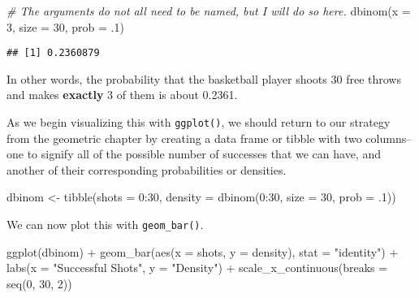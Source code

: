 \documentclass[
]{book}
\newenvironment{Shaded}{\begin{snugshade}}{\end{snugshade}}
\newcommand{\AttributeTok}[1]{\textcolor[rgb]{0.77,0.63,0.00}{#1}}
\newcommand{\CommentTok}[1]{\textcolor[rgb]{0.56,0.35,0.01}{\textit{#1}}}
\newcommand{\DecValTok}[1]{\textcolor[rgb]{0.00,0.00,0.81}{#1}}
\newcommand{\FunctionTok}[1]{\textcolor[rgb]{0.00,0.00,0.00}{#1}}
\newcommand{\NormalTok}[1]{#1}
\newcommand{\OtherTok}[1]{\textcolor[rgb]{0.56,0.35,0.01}{#1}}
\newcommand{\SpecialCharTok}[1]{\textcolor[rgb]{0.00,0.00,0.00}{#1}}
\newcommand{\StringTok}[1]{\textcolor[rgb]{0.31,0.60,0.02}{#1}}
\begin{document}
\begin{Shaded}
\begin{Highlighting}[]
\CommentTok{\# The arguments do not all need to be named, but I will do so here.}
\FunctionTok{dbinom}\NormalTok{(}\AttributeTok{x =} \DecValTok{3}\NormalTok{, }\AttributeTok{size =} \DecValTok{30}\NormalTok{, }\AttributeTok{prob =}\NormalTok{ .}\DecValTok{1}\NormalTok{)}
\end{Highlighting}
\end{Shaded}

\begin{verbatim}
## [1] 0.2360879
\end{verbatim}

In other words, the probability that the basketball player shoots 30 free throws and makes \textbf{exactly} 3 of them is about 0.2361.

As we begin visualizing this with \texttt{ggplot()}, we should return to our strategy from the geometric chapter by creating a data frame or tibble with two columns--one to signify all of the possible number of successes that we can have, and another of their corresponding probabilities or densities.

\begin{Shaded}
\begin{Highlighting}[]
\NormalTok{dbinom }\OtherTok{\textless{}{-}} \FunctionTok{tibble}\NormalTok{(}\AttributeTok{shots =} \DecValTok{0}\SpecialCharTok{:}\DecValTok{30}\NormalTok{,}
                 \AttributeTok{density =} \FunctionTok{dbinom}\NormalTok{(}\DecValTok{0}\SpecialCharTok{:}\DecValTok{30}\NormalTok{, }\AttributeTok{size =} \DecValTok{30}\NormalTok{, }\AttributeTok{prob =}\NormalTok{ .}\DecValTok{1}\NormalTok{))}
\end{Highlighting}
\end{Shaded}

We can now plot this with \texttt{geom\_bar()}.

\begin{Shaded}
\begin{Highlighting}[]
\FunctionTok{ggplot}\NormalTok{(dbinom) }\SpecialCharTok{+}
  \FunctionTok{geom\_bar}\NormalTok{(}\FunctionTok{aes}\NormalTok{(}\AttributeTok{x =}\NormalTok{ shots, }\AttributeTok{y =}\NormalTok{ density),}
           \AttributeTok{stat =} \StringTok{"identity"}\NormalTok{) }\SpecialCharTok{+}
  \FunctionTok{labs}\NormalTok{(}\AttributeTok{x =} \StringTok{"Successful Shots"}\NormalTok{, }\AttributeTok{y =} \StringTok{"Density"}\NormalTok{) }\SpecialCharTok{+}
  \FunctionTok{scale\_x\_continuous}\NormalTok{(}\AttributeTok{breaks =} \FunctionTok{seq}\NormalTok{(}\DecValTok{0}\NormalTok{, }\DecValTok{30}\NormalTok{, }\DecValTok{2}\NormalTok{))}
\end{Highlighting}
\end{Shaded}
\end{document}
